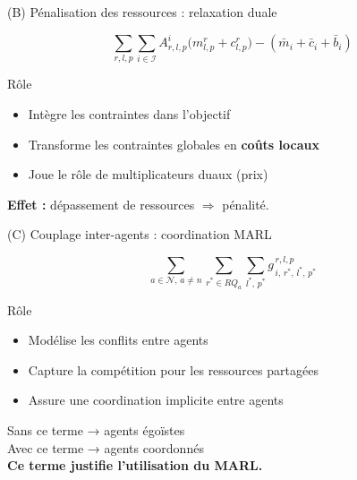 \documentclass{beamer}
\begin{document}
\begin{frame}{(B) Pénalisation des ressources : relaxation duale}

\small
\[
\sum_{r,l,p}\sum_{i\in\mathcal{I}}
A^i_{r,l,p}
\big(
m^r_{l,p}+c^r_{l,p}
\big)
-
(\bar m_i+\bar c_i+\bar b_i)
\]

\begin{block}{Rôle}
\begin{itemize}
  \item Intègre les contraintes dans l’objectif
  \item Transforme les contraintes globales en \textbf{coûts locaux}
  \item Joue le rôle de multiplicateurs duaux (prix)
\end{itemize}
\end{block}

\medskip
\textbf{Effet :} dépassement de ressources $\Rightarrow$ pénalité.
\end{frame}

\begin{frame}{(C) Couplage inter-agents : coordination MARL}

\small
\[
\sum_{a \in \mathcal{N},\, a \neq n}
\sum_{r^{*} \in RQ_a}
\sum_{l^{*},\,p^{*}}
g^{\,r,l,p}_{\,i,\,r^{*},\,l^{*},\,p^{*}}
\]


\begin{block}{Rôle}
\begin{itemize}
  \item Modélise les conflits entre agents
  \item Capture la compétition pour les ressources partagées
  \item Assure une coordination implicite entre agents
\end{itemize}
\end{block}

\medskip
Sans ce terme → agents égoïstes \\

Avec ce terme → agents coordonnés \\ 

\textbf{Ce terme justifie l’utilisation du MARL.} \\
\end{frame}
\end{document}
